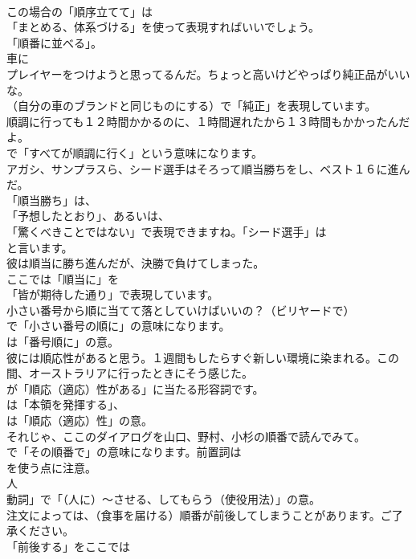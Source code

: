 \documentclass[8pt]{extreport}
\begin{document}
\begin{CJK}{UTF8}{min}
\\	この場合の「順序立てて」は
\\	「まとめる、体系づける」を使って表現すればいいでしょう。
\\	「順番に並べる」。	
\\	車に
\\	プレイヤーをつけようと思ってるんだ。ちょっと高いけどやっぱり純正品がいいな。 
\\	（自分の車のブランドと同じものにする）で「純正」を表現しています。	
\\	順調に行っても１２時間かかるのに、１時間遅れたから１３時間もかかったんだよ。 
\\	で「すべてが順調に行く」という意味になります。	
\\	アガシ、サンプラスら、シード選手はそろって順当勝ちをし、ベスト１６に進んだ。 
\\	「順当勝ち」は、
\\	「予想したとおり」、あるいは、
\\	「驚くべきことではない」で表現できますね。「シード選手」は
\\	と言います。	
\\	彼は順当に勝ち進んだが、決勝で負けてしまった。 
\\	ここでは「順当に」を
\\	「皆が期待した通り」で表現しています。	
\\	小さい番号から順に当てて落としていけばいいの？（ビリヤードで） 
\\	で「小さい番号の順に」の意味になります。
\\	は「番号順に」の意。	
\\	彼には順応性があると思う。１週間もしたらすぐ新しい環境に染まれる。この間、オーストラリアに行ったときにそう感じた。 
\\	が「順応（適応）性がある」に当たる形容詞です。
\\	は「本領を発揮する」、
\\	は「順応（適応）性」の意。	
\\	それじゃ、ここのダイアログを山口、野村、小杉の順番で読んでみて。 
\\	で「その順番で」の意味になります。前置詞は
\\	を使う点に注意。
\\	人 
\\	動詞」で「（人に）～させる、してもらう（使役用法）」の意。	
\\	注文によっては、（食事を届ける）順番が前後してしまうことがあります。ご了承ください。 
\\	「前後する」をここでは

\end{CJK}
\end{document}
